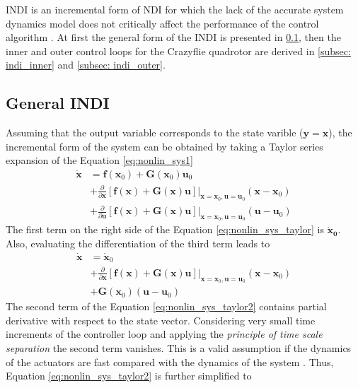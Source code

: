 \documentclass[11pt, a4paper, twoside]{report}
\begin{document}
\acrshort{INDI} is an incremental form of \acrshort{NDI} for which the lack of the accurate system dynamics model does not critically affect the performance of the control algorithm \cite{Silva}. At first the general form of the \acrshort{INDI} is presented in \ref{subsec:indi_general}, then the inner and outer control loops for the Crazyflie quadrotor are derived in \ref{subsec: indi_inner} and \ref{subsec: indi_outer}.

\subsection{General INDI} \label{subsec:indi_general}

Assuming that the output variable corresponds to the state varible ($\bm{y}=\bm{x}$), the incremental form of the system can be obtained by taking a Taylor series expansion of the Equation \ref{eq:nonlin_sys1}
\begin{equation}
	\begin{split}
		\bm{\dot{x}} &= \bm{f}(\bm{x}_0) + \bm{G}(\bm{x}_0)\bm{u}_0 \\
		&+ \frac{\partial}{\partial \bm{x}} [\bm{f}(\bm{x}) + \bm{G}(\bm{x})\bm{u}] \bigg|_{\bm{x}=\bm{x}_0,\bm{u}=\bm{u}_0} (\bm{x}-\bm{x}_0) \\
		&+ \frac{\partial}{\partial \bm{u}} [\bm{f}(\bm{x}) + \bm{G}(\bm{x})\bm{u}] \bigg|_{\bm{x}=\bm{x}_0,\bm{u}=\bm{u}_0} (\bm{u}-\bm{u}_0) 
		\label{eq:nonlin_sys_taylor}
	\end{split}
\end{equation}
The first term on the right side of the Equation \ref{eq:nonlin_sys_taylor} is $\bm{\dot{x}_0}$. Also, evaluating the differentiation of the third term leads to 
\begin{equation}
	\begin{split}
		\bm{\dot{x}} &= \bm{\dot{x}}_0 \\ 
		&+ \frac{\partial}{\partial \bm{x}} [\bm{f}(\bm{x}) + \bm{G}(\bm{x})\bm{u}] \bigg|_{\bm{x}=\bm{x}_0,\bm{u}=\bm{u}_0} (\bm{x}-\bm{x}_0) \\
		&+ \bm{G}(\bm{x}_0) (\bm{u}-\bm{u}_0) 
		\label{eq:nonlin_sys_taylor2}
	\end{split}
\end{equation}
The second term of the Equation \ref{eq:nonlin_sys_taylor2} contains partial derivative with respect to the state vector. Considering very small time increments of the controller loop and applying the \textit{principle of time scale separation} the second term vanishes. This is a valid assumption if the dynamics of the actuators are fast compared with the dynamics of the system \cite{Silva}. Thus, Equation \ref{eq:nonlin_sys_taylor2} is further simplified to 
\end{document}
